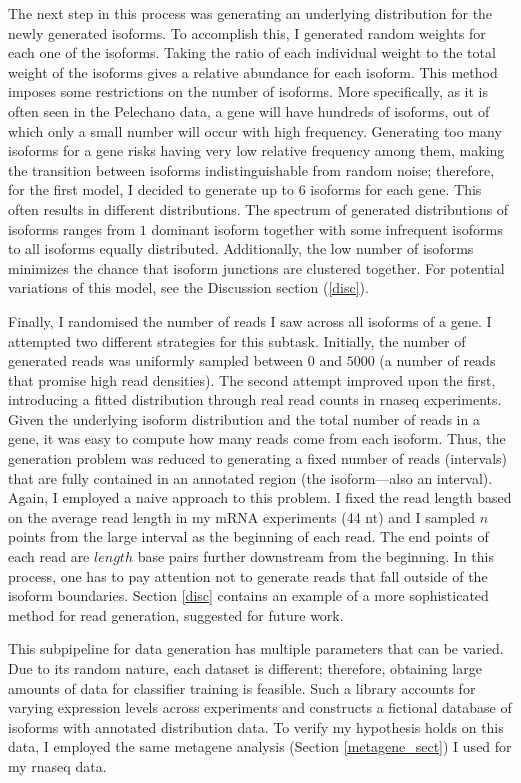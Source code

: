 \documentclass[12pt]{article}
\begin{document}
The next step in this process was generating an underlying distribution for the newly generated isoforms. To accomplish this, I generated random weights for each one of the isoforms. Taking the ratio of each individual weight to the total weight of the isoforms gives a relative abundance for each isoform. This method imposes some restrictions on the number of isoforms. More specifically,  as it is often seen in the Pelechano data, a gene will have hundreds of isoforms, out of which only a small number will occur with high frequency. Generating too many isoforms for a gene risks having very low relative frequency among them, making the transition between isoforms indistinguishable from random noise; therefore, for the first model, I decided to generate up to $6$ isoforms for each gene. This often results in different distributions. The spectrum of generated distributions of isoforms ranges from $1$ dominant isoform together with some infrequent isoforms to  all isoforms equally distributed. Additionally, the low number of isoforms minimizes the chance that isoform junctions are clustered together. For potential variations of this model, see the Discussion section (\ref{disc}).

Finally, I randomised the number of reads I saw across all isoforms of a gene. I attempted two different strategies for this subtask. Initially, the number of generated reads was uniformly sampled between $0$ and $5000$ (a number of reads that promise high read densities). The second attempt improved upon the first, introducing a fitted distribution through real read counts in \acrshort{rnaseq} experiments. Given the underlying isoform distribution and the total number of reads in a gene, it was easy to compute how many reads come from each isoform. Thus, the generation problem was reduced to generating a fixed number of reads (intervals) that are fully contained in an annotated region (the isoform---also an interval). Again, I employed a naive approach to this problem. I fixed the read length based on the average read length in my mRNA experiments (44 nt) and I sampled $n$ points from the large interval as the beginning of each read. The end points of each read are $length$ base pairs further downstream from the beginning. In this process, one has to pay attention not to generate reads that fall outside of the isoform boundaries. Section \ref{disc} contains an example of a more sophisticated method for read generation, suggested for future work.  

This subpipeline for data generation has multiple parameters that can be varied. Due to its random nature, each dataset is different; therefore, obtaining large amounts of data for classifier training is feasible. Such a library accounts for varying expression levels across experiments and constructs a fictional database of isoforms with annotated distribution data. To verify my hypothesis holds on this data, I employed the same metagene analysis (Section \ref{metagene_sect}) I used for my \acrshort{rnaseq} data.  
\end{document}
